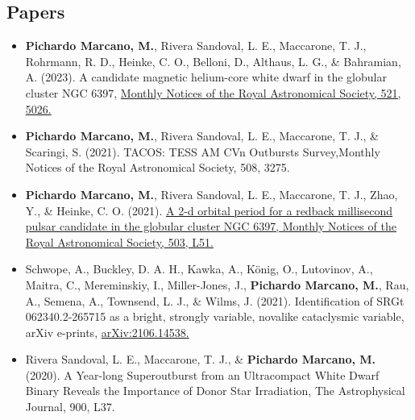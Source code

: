 \documentclass[letterpaper,10pt]{article}
\begin{document}
\subsection*{Papers}
\begin{itemize}[label=$\blacktriangleright$]

\subsubsection*{Refereed}

                \item \textbf{Pichardo Marcano, M.}, Rivera Sandoval, L. E., Maccarone, T. J., Rohrmann, R. D., Heinke, C. O., Belloni, D., Althaus, L. G., \& Bahramian, A. (2023). A candidate magnetic helium-core white dwarf in the globular cluster NGC 6397, \href{https://ui.adsabs.harvard.edu/abs/2023MNRAS.521.5026P/abstract}{Monthly Notices of the Royal Astronomical Society, 521, 5026.}



        
        \item \textbf{Pichardo Marcano, M.}, Rivera Sandoval, L. E., Maccarone, T. J., \& Scaringi, S. (2021). TACOS: TESS AM CVn Outbursts Survey,Monthly Notices of the Royal Astronomical Society, 508, 3275.


        
                
            \item \textbf{Pichardo Marcano, M.}, Rivera Sandoval, L. E., Maccarone, T. J., Zhao, Y., \& Heinke, C. O. (2021). \href{https://ui.adsabs.harvard.edu/abs/2021MNRAS.503L..51P/abstract}{A 2-d orbital period for a redback millisecond pulsar candidate in the globular cluster NGC 6397, Monthly Notices of the Royal Astronomical Society, 503, L51.}
        
        
        \item Schwope, A., Buckley, D. A. H., Kawka, A., K\"onig, O., Lutovinov, A., Maitra, C., Mereminskiy, I., Miller-Jones, J., \textbf{Pichardo Marcano, M.}, Rau, A., Semena, A., Townsend, L. J., \& Wilms, J. (2021). Identification of SRGt 062340.2-265715 as a bright, strongly variable, novalike cataclysmic variable, arXiv e-prints, \href{https://ui.adsabs.harvard.edu/abs/2021arXiv210614538S/abstract}{arXiv:2106.14538.}





        
        
    \item Rivera Sandoval, L. E., Maccarone, T. J., \& \textbf{Pichardo Marcano, M.} (2020). A Year-long Superoutburst from an Ultracompact White Dwarf Binary Reveals the Importance of Donor Star Irradiation, The Astrophysical Journal, 900, L37. \\


\end{itemize}
\end{document}
